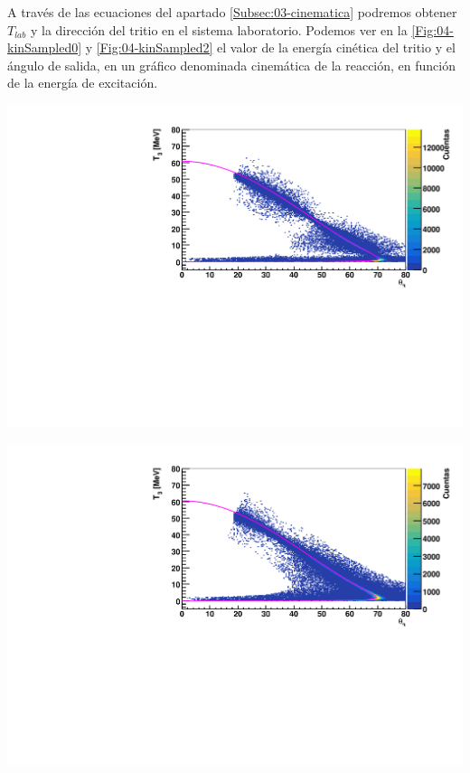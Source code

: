 \begin{enumerate}
    A través de las ecuaciones del apartado \ref{Subsec:03-cinematica} podremos obtener $T_{lab}$ y la dirección del tritio en el sistema laboratorio. Podemos ver en la \cref{Fig:04-kinSampled0} y \cref{Fig:04-kinSampled2} el valor de la energía cinética del tritio y el ángulo de salida, en un gráfico denominada cinemática de la reacción, en función de la energía de excitación.
    
    \begin{minipage}{0.49\linewidth} \centering
        \includegraphics[width=1\linewidth]{Imagenes/Kinematics/KinSampled_Ex0.00_incIdx0.pdf} 

        \label{Fig:04-kinSampled0}
    \end{minipage} \hfill
    \begin{minipage}{0.49\linewidth}
        \includegraphics[width=1\linewidth]{Imagenes/Kinematics/KinSampled_Ex0.20_incIdx0.pdf}


\end{minipage}
\end{enumerate}
